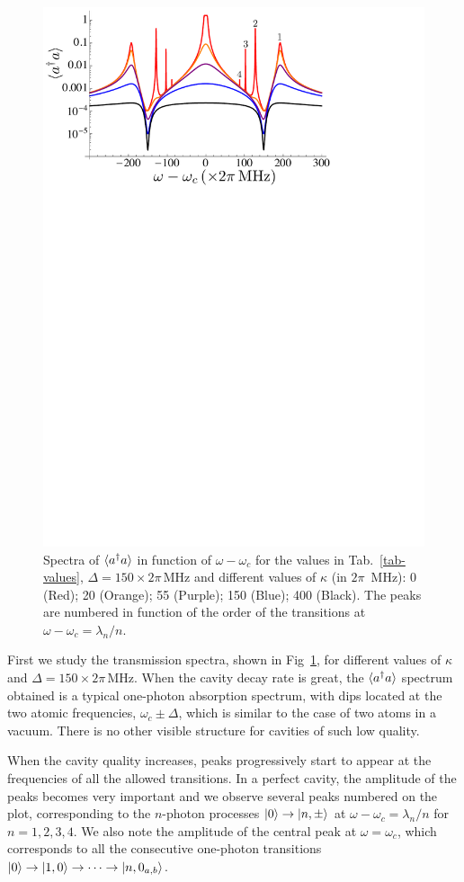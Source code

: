 \begin{figure}
    \center
    \includegraphics[width=0.75 \textwidth]{Images/chap5/aa_kappa.pdf}
    \caption[ $\mean{a^\dagger a}$ in function of $\omega-\omega_c$]{ Spectra of $\mean{a^\dagger a}$ in function of $\omega-\omega_c$ for the values in Tab.~\ref{tab-values}, $\Delta=150 \times 2\pi\,\mbox{MHz}$ and different values of $\kappa$ (in $2\pi$~MHz): 0 (Red); 20 (Orange); 55 (Purple); 150 (Blue); 400 (Black). The peaks are numbered in function of the order of the transitions at $\omega-\omega_c=\lambda_n/n$.}
    \label{fig-aa_kappa}
\end{figure}

First we study the transmission spectra, shown in Fig~\ref{fig-aa_kappa}, for different values of $\kappa$ and $\Delta=150 \times 2\pi\,\mbox{MHz}$. When the cavity decay rate is great, the $\mean{a^\dagger a}$ spectrum obtained is a typical one-photon absorption spectrum, with dips located at the two atomic frequencies, $\omega_c \pm \Delta$, which is similar to the case of two atoms in a vacuum. There is no other visible structure for cavities of such low quality.

When the cavity quality increases, peaks progressively start to appear at the frequencies of all the allowed transitions. In a perfect cavity, the amplitude of the peaks becomes very important and we observe several peaks numbered on the plot, corresponding to the $n$-photon processes $| 0 \rangle \rightarrow | n,\pm \rangle$ at $\omega-\omega_c=\lambda_n/n$ for $n=1,2,3,4$. We also note the amplitude of the central peak at $\omega=\omega_c$, which corresponds to all the consecutive one-photon transitions $| 0 \rangle \rightarrow | 1,0 \rangle\rightarrow \cdots \rightarrow | n,0_{a,b} \rangle$.


